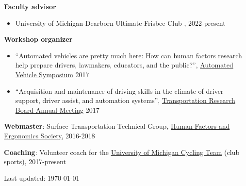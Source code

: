 \documentclass[11pt]{article}
\newenvironment{main}
{\begin{adjustwidth}{3em}{}}
{\end{adjustwidth}}
\begin{document}
\begin{main}
\textbf{Faculty advisor}
\begin{itemize}
    \item University of Michigan-Dearborn Ultimate Frisbee Club , 2022-present
\end{itemize}

\textbf{Workshop organizer}
\begin{itemize}
    \item ``Automated vehicles are pretty much here: How can human factors research help prepare drivers, lawmakers, educators, and the public?'', \href{www.automatedvehiclessymposium.org}{Automated Vehicle Symposium} 2017
    \item ``Acquisition and maintenance of driving skills in the climate of driver support, driver assist, and automation systems'', \href{http://www.trb.org/AnnualMeeting/}{Transportation Research Board Annual Meeting} 2017
\end{itemize}

\textbf{Webmaster}: Surface Transportation Technical Group, \href{https://www.hfes.org/}{Human Factors and Ergonomics Society}, 2016-2018

\textbf{Coaching}: Volunteer coach for the \href{https://www.umcycling.org/}{University of Michigan Cycling Team} (club sports), 2017-present


\vfill\hfill
Last updated: \today

\end{main}
\end{document}
